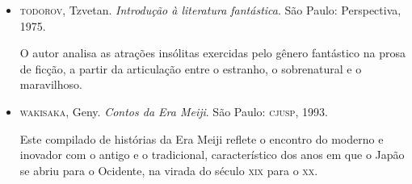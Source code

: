 \documentclass[12pt]{extarticle}
\begin{document}
\begin{itemize}
\item\textsc{todorov}, Tzvetan. \textit{Introdução à literatura fantástica}.
  São Paulo: Perspectiva, 1975.

  O autor analisa as atrações insólitas exercidas pelo gênero fantástico na
prosa de ficção, a partir da articulação entre o estranho, o sobrenatural e o
maravilhoso. 

\item\textsc{wakisaka}, Geny. \textit{Contos da Era Meiji}. São Paulo:
  \textsc{cjusp}, 1993.

Este compilado de histórias da Era Meiji reflete o encontro do moderno e
inovador com o antigo e o tradicional, característico dos anos em que o Japão
se abriu para o Ocidente, na virada do século \textsc{xix} para o \textsc{xx}.
\end{itemize}
\end{document}
